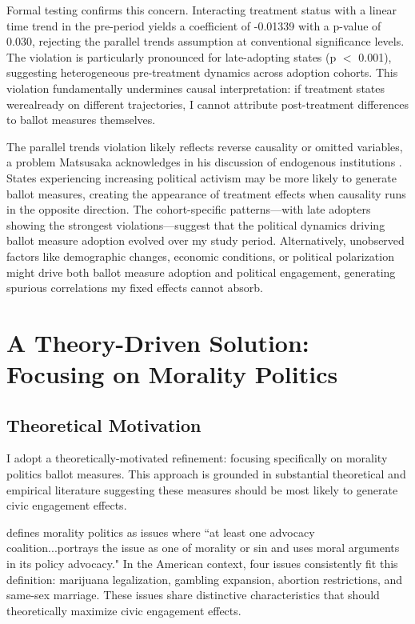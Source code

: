 \documentclass[12pt,letterpaper,oneside]{book}
\begin{document}
Formal testing confirms this concern. Interacting treatment status with a linear time trend in the pre-period yields a coefficient of -0.01339 with a p-value of 0.030, rejecting the parallel trends assumption at conventional significance levels. The violation is particularly pronounced for late-adopting states (p $<$ 0.001), suggesting heterogeneous pre-treatment dynamics across adoption cohorts. This violation fundamentally undermines causal interpretation: if treatment states werealready on different trajectories, I cannot attribute post-treatment differences to ballot measures themselves.

The parallel trends violation likely reflects reverse causality or omitted variables, a problem Matsusaka acknowledges in his discussion of endogenous institutions \citep{matsusaka2018public}. States experiencing increasing political activism may be more likely to generate ballot measures, creating the appearance of treatment effects when causality runs in the opposite direction. The cohort-specific patterns—with late adopters showing the strongest violations—suggest that the political dynamics driving ballot measure adoption evolved over my study period. Alternatively, unobserved factors like demographic changes, economic conditions, or political polarization might drive both ballot measure adoption and political engagement, generating spurious correlations my fixed effects cannot absorb.

\section{A Theory-Driven Solution: Focusing on Morality Politics}

\subsection{Theoretical Motivation}

I adopt a theoretically-motivated refinement: focusing specifically on morality politics ballot measures. This approach is grounded in substantial theoretical and empirical literature suggesting these measures should be most likely to generate civic engagement effects.

\citet{mooney2001public} defines morality politics as issues where ``at least one advocacy coalition...portrays the issue as one of morality or sin and uses moral arguments in its policy advocacy." In the American context, four issues consistently fit this definition: marijuana legalization, gambling expansion, abortion restrictions, and same-sex marriage. These issues share distinctive characteristics that should theoretically maximize civic engagement effects.
\end{document}
